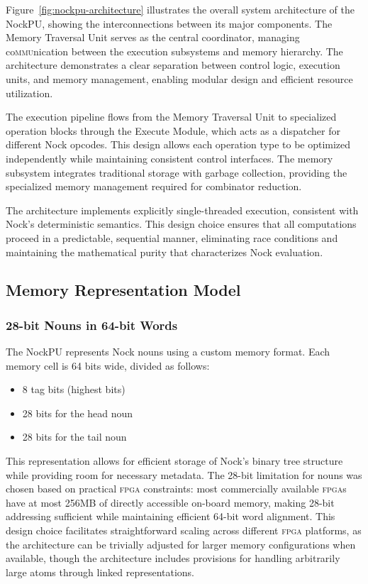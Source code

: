 \documentclass[twoside]{article}
\begin{document}
\noindent\sloppy
Figure~\ref{fig:nockpu-architecture} illustrates the overall system architecture of the NockPU, showing the interconnections between its major components. The Memory Traversal Unit serves as the central coordinator, managing co\textsc{mmu}nication between the execution subsystems and memory hierarchy. The architecture demonstrates a clear separation between control logic, execution units, and memory management, enabling modular design and efficient resource utilization.



The execution pipeline flows from the Memory Traversal Unit to specialized operation blocks through the Execute Module, which acts as a dispatcher for different Nock opcodes. This design allows each operation type to be optimized independently while maintaining consistent control interfaces. The memory subsystem integrates traditional storage with garbage collection, providing the specialized memory management required for combinator reduction.

The architecture implements explicitly single-threaded execution, consistent with Nock's deterministic semantics. This design choice ensures that all computations proceed in a predictable, sequential manner, eliminating race conditions and maintaining the mathematical purity that characterizes Nock evaluation.

\subsection{Memory Representation Model}

\subsubsection{28-bit Nouns in 64-bit Words}

The NockPU represents Nock nouns using a custom memory format. Each memory cell is 64 bits wide, divided as follows:

\begin{itemize}
  \item 8 tag bits (highest bits)
  \item 28 bits for the head noun
  \item 28 bits for the tail noun
\end{itemize}

\noindent
This representation allows for efficient storage of Nock's binary tree structure while providing room for necessary metadata. The 28-bit limitation for nouns was chosen based on practical \textsc{fpga} constraints: most commercially available \textsc{fpga}s have at most 256MB of directly accessible on-board memory, making 28-bit addressing sufficient while maintaining efficient 64-bit word alignment. This design choice facilitates straightforward scaling across different \textsc{fpga} platforms, as the architecture can be trivially adjusted for larger memory configurations when available, though the architecture includes provisions for handling arbitrarily large atoms through linked representations.
\end{document}
